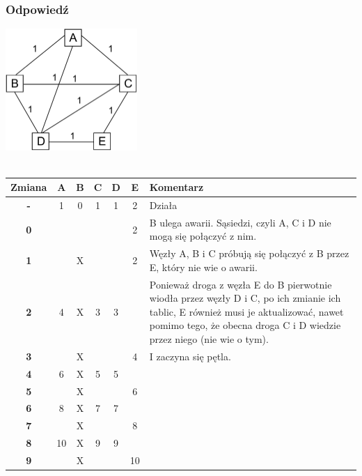 		\subsubsection{Odpowiedź}
			\includegraphics[width=5.0cm]{./images/zadanie04.pdf}\\\\
			\begin{tabular}{|c|c|c|c|c|c|p{7cm}|}
				\hline \textbf{Zmiana} & \textbf{A} & \textbf{B} & \textbf{C} & \textbf{D} & \textbf{E} & \textbf{Komentarz} \\ 
				\hline \textbf{-} & 1 & 0 & 1 & 1 & 2 & Działa \\ 
				\hline \textbf{0} & \color{red}{inf} & \color{red}{X} & \color{red}{inf} & \color{red}{inf} & 2 & B ulega awarii. Sąsiedzi, czyli A, C i D nie mogą się połączyć z nim. \\ 
				\hline \textbf{1} & \color{red}{4} & X & \color{red}{3} & \color{red}{3} & 2 & Węzły A, B i C próbują się połączyć z B przez E, który nie wie o awarii. \\ 
				\hline \textbf{2} & 4 & X & 3 & 3 & \color{red}{4} & Ponieważ droga z węzła E do B pierwotnie wiodła przez węzły D i C, po ich zmianie ich tablic, E również musi je aktualizować, nawet pomimo tego, że obecna droga C i D wiedzie przez niego (nie wie o tym). \\
				\hline \textbf{3} & \color{red}{6} & X & \color{red}{5} & \color{red}{5} & 4 & I zaczyna się pętla. \\ 
				\hline \textbf{4} & 6 & X & 5 & 5 & \color{red}{6} &  \\ 
				\hline \textbf{5} & \color{red}{8} & X & \color{red}{7} & \color{red}{7} & 6 &  \\ 
				\hline \textbf{6} & 8 & X & 7 & 7 & \color{red}{8} &  \\ 
				\hline \textbf{7} & \color{red}{10} & X & \color{red}{9} & \color{red}{9} & 8 &  \\ 
				\hline \textbf{8} & 10 & X & 9 & 9 & \color{red}{10} &  \\ 
				\hline \textbf{9} & \color{red}{12} & X & \color{red}{11} & \color{red}{11} & 10 &  \\ 

\end{tabular}
